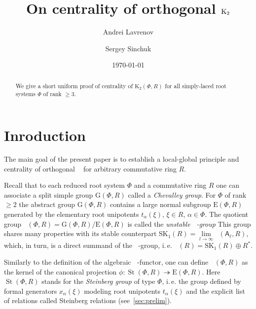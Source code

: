 \documentclass[11pt]{amsart}
\title{On centrality of orthogonal $\Kt$}
\author {Andrei Lavrenov}
\author{Sergey Sinchuk}
\date {\today}
\theoremstyle{plain} \declaretheorem[name=Theorem, Refname={Theorem,Theorems}]{tm} \Crefname{tm}{Theorem}{Theorems}
\numberwithin{equation}{section}
\theoremstyle{definition} \newtheorem{df}[lm]{Definition} \Crefname{df}{Definition}{Definitions}
\theoremstyle{remark} \newtheorem{rk}[lm]{Remark} \Crefname{rk}{Remark}{Remarks}
\newcommand{\E}{{\mathrm{E}}}
\newcommand{\GG}{{\mathrm{G}}}
\newcommand{\St}{\mathop{\mathrm{St}}\nolimits}
\newcommand{\Kt}{\mathop{\mathrm{K_2}}\nolimits}
\newcommand{\Ko}{\mathop{\mathrm{K_1}}\nolimits}
\newcommand{\rA}{\mathsf{A}}
\begin{document}
\begin{abstract} We give a short uniform proof of centrality of $\mathrm K_2(\Phi, R)$ for all simply-laced root systems $\Phi$ of rank $\geq 3$.
\end{abstract}

\maketitle


\section*{Inroduction}
The main goal of the present paper is to establish a local-global principle and centrality of orthogonal $\Kt$ for arbitrary commutative ring $R$.

Recall that to each reduced root system $\Phi$ and a commutative ring $R$ one can associate a split simple group $\GG(\Phi, R)$ called a \emph{Chevalley group}.
For $\Phi$ of rank $\geq 2$ the abstract group $\GG(\Phi, R)$ contains a large normal subgroup $\E(\Phi, R)$ generated by the elementary root unipotents $t_\alpha(\xi)$, $\xi\in R$, $\alpha\in \Phi$.
The quotient group $\Ko(\Phi, R)=\GG(\Phi, R)/\E(\Phi, R)$ is called the \emph{unstable $\Ko$-group}
This group shares many properties with its stable counterpart $\mathrm{SK}_1(R) = \lim\limits_{l\to\infty}\Ko(\rA_\ell, R)$, which, in turn,
is a direct summand of the $\Ko$-group, i.\,e. $\Ko(R) = \mathrm{SK}_1(R) \oplus R^*$.

Similarly to the definition of the algebraic $\Kt$-functor, one can define $\Kt(\Phi, R)$ as the kernel of the canonical projection $\phi\colon\St(\Phi, R)\twoheadrightarrow \E(\Phi, R)$.
Here $\St(\Phi, R)$ stands for the \emph{Steinberg group} of type $\Phi$, i.\,e. the group defined by formal generators $x_\alpha(\xi)$ modeling root unipotents $t_\alpha(\xi)$
and the explicit list of relations called Steinberg relations (see~\cref{sec:prelim}). 
\end{document}
